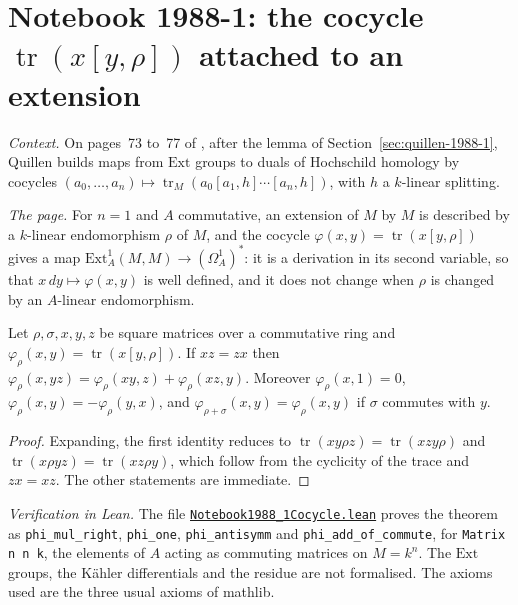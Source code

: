 \section[{Notebook 1988-1: the cocycle $\mathrm{tr}(x[y, \rho])$}]{Notebook 1988-1: the cocycle $\operatorname{tr}(x[y, \rho])$ attached to an extension\protect{}}\label{sec:quillen-1988-1-cocycle}

\emph{Context.} On pages~73 to~77 of , after the lemma of Section~\ref{sec:quillen-1988-1}, Quillen builds maps from $\mathrm{Ext}$ groups to duals of Hochschild homology by cocycles $(a_0, \ldots, a_n) \mapsto \operatorname{tr}_M(a_0[a_1, h]\cdots[a_n, h])$, with $h$ a $k$-linear splitting.

\emph{The page.} For $n = 1$ and $A$ commutative, an extension of $M$ by $M$ is described by a $k$-linear endomorphism $\rho$ of $M$, and the cocycle $\varphi(x, y) = \operatorname{tr}(x[y, \rho])$ gives a map $\mathrm{Ext}^1_A(M, M) \to (\Omega^1_A)^*$: it is a derivation in its second variable, so that $x\,dy \mapsto \varphi(x, y)$ is well defined, and it does not change when $\rho$ is changed by an $A$-linear endomorphism.

\begin{encadre}
\begin{theoreme}\label{thm:quillen-1988-1-cocycle}
Let $\rho, \sigma, x, y, z$ be square matrices over a commutative ring and $\varphi_\rho(x, y) = \operatorname{tr}(x[y, \rho])$. If $xz = zx$ then $\varphi_\rho(x, yz) = \varphi_\rho(xy, z) + \varphi_\rho(xz, y)$. Moreover $\varphi_\rho(x, 1) = 0$, $\varphi_\rho(x, y) = -\varphi_\rho(y, x)$, and $\varphi_{\rho + \sigma}(x, y) = \varphi_\rho(x, y)$ if $\sigma$ commutes with $y$.
\end{theoreme}
\end{encadre}

\begin{proof}
Expanding, the first identity reduces to $\operatorname{tr}(xy\rho z) = \operatorname{tr}(xzy\rho)$ and $\operatorname{tr}(x\rho yz) = \operatorname{tr}(xz\rho y)$, which follow from the cyclicity of the trace and $zx = xz$. The other statements are immediate.
\end{proof}

\emph{Verification in Lean.} The file \href{\leanblobmain/Notebook1988_1Cocycle.lean}{\texttt{Notebook1988\_1Cocycle.\allowbreak{}lean}} proves the theorem as \texttt{phi\_mul\_right}, \texttt{phi\_one}, \texttt{phi\_antisymm} and \texttt{phi\_add\_of\_commute}, for \texttt{Matrix n n k}, the elements of $A$ acting as commuting matrices on $M = k^n$. The $\mathrm{Ext}$ groups, the Kähler differentials and the residue are not formalised. The axioms used are the three usual axioms of mathlib.

